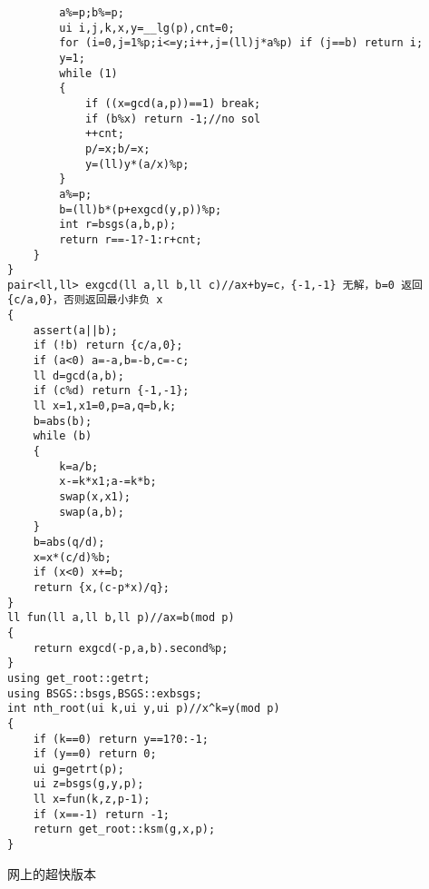 \documentclass[12pt]{ctexart}
\begin{document}
\begin{lstlisting}
		a%=p;b%=p;
		ui i,j,k,x,y=__lg(p),cnt=0;
		for (i=0,j=1%p;i<=y;i++,j=(ll)j*a%p) if (j==b) return i;
		y=1;
		while (1)
		{
			if ((x=gcd(a,p))==1) break;
			if (b%x) return -1;//no sol
			++cnt;
			p/=x;b/=x;
			y=(ll)y*(a/x)%p;
		}
		a%=p;
		b=(ll)b*(p+exgcd(y,p))%p;
		int r=bsgs(a,b,p);
		return r==-1?-1:r+cnt;
	}
}
pair<ll,ll> exgcd(ll a,ll b,ll c)//ax+by=c，{-1,-1} 无解，b=0 返回 {c/a,0}，否则返回最小非负 x
{
	assert(a||b);
	if (!b) return {c/a,0};
	if (a<0) a=-a,b=-b,c=-c;
	ll d=gcd(a,b);
	if (c%d) return {-1,-1};
	ll x=1,x1=0,p=a,q=b,k;
	b=abs(b);
	while (b)
	{
		k=a/b;
		x-=k*x1;a-=k*b;
		swap(x,x1);
		swap(a,b);
	}
	b=abs(q/d);
	x=x*(c/d)%b;
	if (x<0) x+=b;
	return {x,(c-p*x)/q};
}
ll fun(ll a,ll b,ll p)//ax=b(mod p)
{
	return exgcd(-p,a,b).second%p;
}
using get_root::getrt;
using BSGS::bsgs,BSGS::exbsgs;
int nth_root(ui k,ui y,ui p)//x^k=y(mod p)
{
	if (k==0) return y==1?0:-1;
	if (y==0) return 0;
	ui g=getrt(p);
	ui z=bsgs(g,y,p);
	ll x=fun(k,z,p-1);
	if (x==-1) return -1;
	return get_root::ksm(g,x,p);
}
\end{lstlisting}

网上的超快版本
\end{document}
